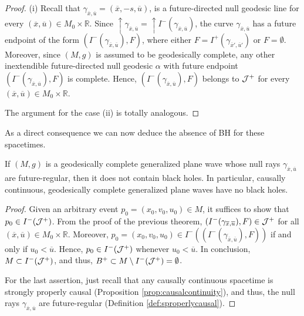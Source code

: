 \begin{proof}
(i) Recall that $\gamma_{\overline{x},\overline{u}}=(\overline{x},-s,\overline{u})$, is a future-directed null geodesic line for every $(\overline{x},\overline{u})\in M_0\times {\mathbb R}$. Since $\uparrow \gamma_{\overline{x},\overline{u}}=\uparrow I^-(\gamma_{\overline{x},\overline{u}})$, the curve $\gamma_{\overline{x},\overline{u}}$ has a future endpoint of the form $(I^-(\gamma_{\overline{x},\overline{u}}),F)$, where either $F=I^+(\gamma_{\overline{x}',\overline{u}'})$ or $F=\emptyset$.
Moreover, since $(M,g)$ is assumed to be geodesically complete, any other inextendible future-directed null geodesic $\alpha$ with future endpoint $(I^-(\gamma_{\overline{x},\overline{u}}),F)$ is complete. Hence, $(I^{-}(\gamma_{\overline{x},\overline{u}}),F)$ belongs to ${\cal J}^+$ for every $(\overline{x},\overline{u})\in M_0\times {\mathbb R}$.

The argument for the case (ii) is totally analogous.
\end{proof}

\noindent As a direct consequence we can now deduce the absence of BH for these spacetimes.
\begin{corollary}\label{cc}
 If $(M,g)$ is a geodesically complete generalized plane wave whose null rays $\gamma_{\overline{x},\overline{u}}$ are future-regular, then it does not contain black holes. In particular, causally continuous, geodesically complete generalized plane waves have no black holes.
\end{corollary}

\begin{proof}
Given an arbitrary event $p_0=(x_0,v_0,u_0)\in M$, it suffices to show that $p_0\in I^-({\cal J}^+)$. From the proof of the previous theorem, $(I^{-}(\gamma_{\overline{x},\overline{u}}),F)\in {\cal J}^+$ for all $(\overline{x},\overline{u})\in M_0\times {\mathbb R}$. Moreover, $p_0=(x_0,v_0,u_0)\in I^-((I^{-}(\gamma_{\overline{x},\overline{u}}),F))$ if and only if $u_0<\overline{u}$. Hence, $p_0\in I^-({\cal J}^+)$ whenever $u_0<\overline{u}$. In conclusion, $M\subset I^-({\cal J}^+)$, and thus, $B^+\subset M\setminus I^-({\cal J}^+)=\emptyset$.

For the last assertion, just recall that any causally continuous spacetime is strongly properly causal (Proposition \ref{prop:causalcontinuity}), and thus, the null rays $\gamma_{\overline{x},\overline{u}}$ are future-regular (Definition \ref{def:sproperlycausal}).
\end{proof}

